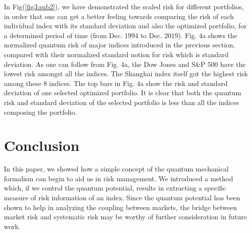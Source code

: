 \documentclass[journal,article,submit,moreauthors,pdftex]{Definitions/mdpi}
\begin{document}
In Fig(\ref{fig3:sub2}), we have demonstrated the scaled risk for different
portfolios, in order that one can get a better feeling towards comparing the
risk of each individual index with its standard deviation and also the
optimized portfolio, for a determined period of time (from Dec. 1994 to Dec.
2019). Fig. 4a shows the normalized quantum risk of major indices introduced
in the previous section, compared with their normalized standard notion for
risk which is standard deviation. As one can follow from Fig. 4a, the Dow
Jones and S\&P 500 have the lowest risk amongst all the indices. The
Shanghai index itself got the highest risk among these 8 indices. The top
bars in Fig. 4a show the risk and standard deviation of one selected
optimized portfolio. It is clear that both the quantum risk and standard
deviation of the selected portfolio is less than all the indices composing
the portfolio.

\newpage

\section{Conclusion}

In this paper, we showed how a simple concept of the quantum mechanical
formalism can begin to aid us in risk management. We introduced a method
which, if we control the quantum potential, results in extracting a specific
measure of risk information of an index. Since the quantum potential has
been shown to help in analyzing the coupling between markets, the bridge
between market risk and systematic risk may be worthy of further
consideration in future work.













\end{document}
